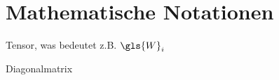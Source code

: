 \section{Mathematische Notationen}
\label{mathematische_notationen}

Tensor, was bedeutet z.B. $\gls{W}_i$

Diagonalmatrix
